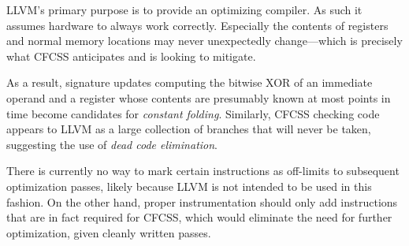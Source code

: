 LLVM's primary purpose is to provide an optimizing compiler. As such it assumes
hardware to always work correctly. Especially the contents of registers and
normal memory locations may never unexpectedly change—which is precisely what
CFCSS anticipates and is looking to mitigate.

As a result, signature updates computing the bitwise XOR of an immediate
operand and a register whose contents are presumably known at most points in
time become candidates for \emph{constant folding}. Similarly, CFCSS checking
code appears to LLVM as a large collection of branches that will never be
taken, suggesting the use of \emph{dead code elimination}.

There is currently no way to mark certain instructions as off-limits to
subsequent optimization passes, likely because LLVM is not intended to be used
in this fashion. On the other hand, proper instrumentation should only add
instructions that are in fact required for CFCSS, which would eliminate the
need for further optimization, given cleanly written passes.


